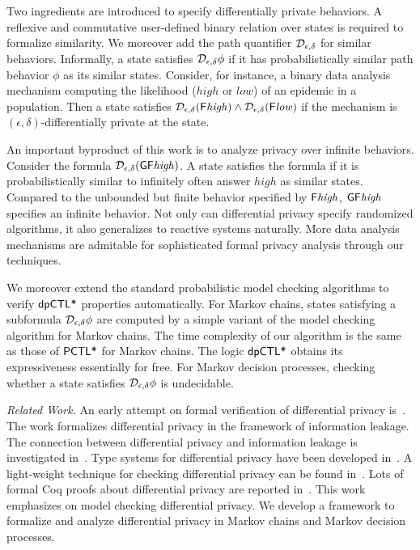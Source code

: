 
Two ingredients are introduced to specify differentially private
behaviors. A reflexive and commutative user-defined binary relation
over states is required to formalize similarity. We moreover add
the path quantifier $\mathcal{D}_{{\epsilon}, {\delta}}$ for similar
behaviors. Informally, a state satisfies $\mathcal{D}_{{\epsilon}, {\delta}}
\phi$ if it has probabilistically similar path behavior $\phi$ as
its similar states. Consider, for instance, a binary data analysis
mechanism computing the likelihood ($\mathit{high}$ or $\mathit{low}$)
of an epidemic in a population. Then a state satisfies
$\mathcal{D}_{{\epsilon}, {\delta}} (\mathsf{F} \mathit{high}) \wedge
\mathcal{D}_{{\epsilon}, {\delta}} (\mathsf{F} \mathit{low})$ if the mechanism is
$(\epsilon, \delta)$-differentially private at the state.


An important byproduct of this work is to analyze privacy over
infinite behaviors. Consider the formula $\mathcal{D}_{{\epsilon}, {\delta}}
(\mathsf{G} \mathsf{F} \mathit{high})$. A state satisfies the formula if it
is probabilistically similar to  infinitely often
answer $\mathit{high}$ as similar states. Compared to the unbounded
but finite behavior specified by $\mathsf{F} \mathit{high}$,
$\mathsf{G} \mathsf{F} \mathit{high}$ specifies an infinite behavior.
Not only can differential privacy specify randomized algorithms, it
also generalizes to reactive systems naturally.
More data analysis mechanisms are admitable for sophisticated formal
privacy analysis through our techniques.


We moreover extend the standard probabilistic model checking
algorithms to verify $\textsf{dpCTL*}$ properties automatically. For Markov
chains, states
satisfying a subformula $\mathcal{D}_{{\epsilon}, {\delta}} \phi$ are computed
by a simple variant of the model checking algorithm for Markov chains.
The time complexity of our algorithm is the same as
those of $\textsf{PCTL*}$ for Markov chains. The logic $\textsf{dpCTL*}$ obtains its
expressiveness essentially for free.
For Markov decision processes, checking whether a state
satisfies $\mathcal{D}_{{\epsilon}, {\delta}} \phi$ is undecidable.


\noindent
\emph{Related Work.}
An early attempt on formal verification of differential privacy
is~\cite{TKD:11:FVDPIS}. The work formalizes differential privacy in
the framework of information leakage. The connection between
differential privacy and information leakage is investigated
in~\cite{AACDP:15:OILDPM,GMP:16:PDPFPS}. Type systems for differential
privacy have been developed
in~\cite{WHRP:17:FADP,GHHNP:13:LDPDP,RP:10:DMTGS}. A light-weight
technique for checking differential privacy can be found
in~\cite{ZK:17:LTADPP}. Lots of formal Coq proofs about differential
privacy are reported
in~\cite{BFGGHS:16:APCDP,BGGHS:16:PDPPC,BKOB:12:PRRDP,BDGKZ:13:VCDPASM,BGAHKS:14:PDPHL,BGAHRS:15:HOARRT,BFGAGHS:16:DPBP}. This
work emphasizes on model checking differential privacy. We develop a
framework to formalize and analyze differential privacy in Markov
chains and Markov decision processes.

